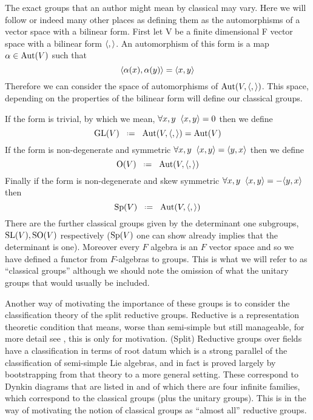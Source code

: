 The exact groups that an author might mean by classical may vary. Here we will follow \cite[\S 13]{CliffordAlgebrasClassical} or indeed many other places as defining them as the automorphisms of a vector space with a bilinear form. First let V be a finite dimensional F vector space with a bilinear form \(\langle ,\rangle\). An automorphism of this form is a map \(\alpha\in \operatorname{Aut}(V)\) such that 
\[\langle \alpha(x), \alpha(y)\rangle = \langle x,y\rangle\]
Therefore we can consider the space of automorphisms of \(\operatorname{Aut}(V, \langle ,\rangle)\). This space, depending on the properties of the bilinear form will define our classical groups. 

If the form is trivial, by which we mean, \(\forall x,y \;\; \langle x, y\rangle = 0\) then we define 
\[\GL(V) \defeq \Aut(V, \inner{,}) = \Aut(V)\]
If the form is non-degenerate and symmetric \(\forall x,y \;\; \langle x, y\rangle = \langle y,x\rangle\) then we define
\[\mathrm{O}(V) \defeq \Aut(V, \inner{,})\]
Finally if the form is non-degenerate and skew symmetric \(\forall x,y \;\; \langle x, y\rangle = -\langle y,x\rangle\) then 
\[\Sp(V) \defeq \Aut(V, \inner{,})\]
There are the further classical groups given by the determinant one subgroups, \(\operatorname{SL}(V), \mathrm{SO}(V)\) respectively (\(\operatorname{Sp}(V)\) one can show already implies that the determinant is one). Moreover every \(F\) algebra is an \(F\) vector space and so we have defined a functor from \(F\)-algebras to groups. This is what we will refer to as ``classical groups'' although we should note the omission of what the unitary groups that  would usually be included.

Another way of motivating the importance of these groups is to consider the classification theory of the split reductive groups. Reductive is a representation theoretic condition that means, worse than semi-simple but still manageable, for more detail see \cite[22.138]{milneAlgebraicGroupsTheory2017}, this is only for motivation. (Split) Reductive groups over fields have a classification in terms of root datum \cite[22.48]{milneAlgebraicGroupsTheory2017} which is a strong parallel of the classification of semi-simple Lie algebras, and in fact is proved largely by bootstrapping from that theory to a more general setting. These correspond to Dynkin diagrams that are listed in \cite[Appendix A,B]{shahidiEisensteinSeriesAutomorphic2010} and of which there are four infinite families, which correspond to the classical groups (plus the unitary groups). This is in the way of motivating the notion of classical groups as ``almost all'' reductive groups.


